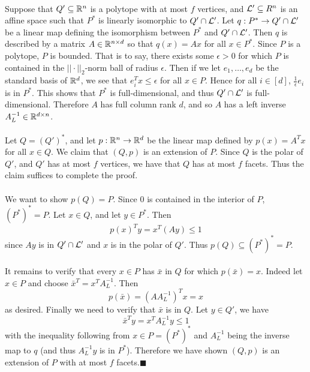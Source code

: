 \documentclass[letterpaper,12pt,oneside,onecolumn]{article}
\begin{document}
\paragraph{}
Suppose that $Q'\subseteq \mathbb{R}^{n}$ is a polytope with at most $f$ vertices, and $\mathcal{L}' \subseteq R^{n}$ is an affine space such that $P^*$ is linearly isomorphic to $Q' \cap \mathcal{L}'$. Let $q: P^* \rightarrow Q'\cap\mathcal{L}'$ be a linear map defining the isomorphism between $P^*$ and $Q'\cap \mathcal{L}'$. Then $q$ is described by a matrix $A \in \mathbb{R}^{n\times d}$ so that $q(x) = Ax$ for all $x \in P^*$. Since $P$ is a polytope, $P$ is bounded. That is to say, there exists some $\epsilon > 0$ for which $P$ is contained in the $||\cdot||_2$-norm ball of radius $\epsilon$. Then if we let $e_1, \dots, e_d$ be the standard basis of $\mathbb{R}^d$, we see that $e_i^T x \leq \epsilon$ for all $x \in P$. Hence for all $i \in [d]$, $\frac{1}{\epsilon}e_i$ is in $P^*$. This shows that $P^*$ is full-dimensional, and thus $Q'\cap \mathcal{L}'$ is full-dimensional. Therefore $A$ has full column rank $d$, and so $A$ has a left inverse $A^{-1}_L \in \mathbb{R}^{d\times n}$.
\paragraph{}
Let $Q = (Q')^*$, and let $p: \mathbb{R}^n \rightarrow \mathbb{R}^d$ be the linear map defined by $p(x) = A^Tx$ for all $x \in Q$. We claim that $(Q,p)$ is an extension of $P$. Since $Q$ is the polar of $Q'$, and $Q'$ has at most $f$ vertices, we have that $Q$ has at most $f$ facets. Thus the claim suffices to complete the proof.
\paragraph{}
We want to show $p(Q) = P$. Since $0$ is contained in the interior of $P$, $(P^*)^* = P$. Let $x \in Q$, and let $y \in P^*$. Then
$$p(x)^Ty = x^T(Ay) \leq 1$$
since $Ay$ is in $Q' \cap \mathcal{L}'$ and $x$ is in the polar of $Q'$. Thus $p(Q) \subseteq (P^*)^* = P$. 
\paragraph{}
It remains to verify that every $x \in P$ has $\bar{x}$ in $Q$ for which $p(\bar{x}) = x$. Indeed let $x \in P$ and choose $\bar{x}^T = x^TA^{-1}_L$. Then
$$p(\bar{x}) = (AA^{-1}_L)^Tx = x$$
as desired. Finally we need to verify that $\bar{x}$ is in $Q$. Let $y \in Q'$, we have
$$ \bar{x}^Ty = x^TA^{-1}_L y \leq 1$$
with the inequality following from $x \in P =(P^*)^*$ and $A^{-1}_L$ being the inverse map to $q$ (and thus $A^{-1}_Ly$ is in $P^*$). Therefore we have shown $(Q,p)$ is an extension of $P$ with at most $f$ facets.$\blacksquare$
\section{}
\paragraph{}

\section{}
\paragraph{}
\end{document}
